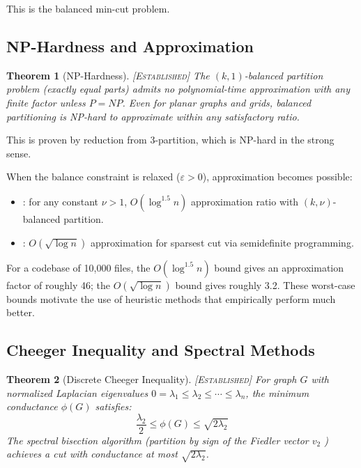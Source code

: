 \documentclass[11pt, a4paper, copyright]{googledeepmind}
\newtheorem{theorem}{Theorem}[section]
\newcommand{\established}{\textsc{[Established]}}
\begin{document}
This is the balanced min-cut problem.

\subsection{NP-Hardness and Approximation}

\begin{theorem}[NP-Hardness] \established{}
\label{thm:nphard}
The $(k, 1)$-balanced partition problem (exactly equal parts) admits no polynomial-time approximation with any finite factor unless $P = NP$.
Even for planar graphs and grids, balanced partitioning is NP-hard to approximate within any satisfactory ratio.
\end{theorem}

This is proven by reduction from 3-partition, which is NP-hard in the strong sense.

When the balance constraint is relaxed ($\varepsilon > 0$), approximation becomes possible:

\begin{itemize}[nosep]
  \item \citet{AndreevRacke2006}: for any constant $\nu > 1$, $O(\log^{1.5} n)$ approximation ratio with $(k, \nu)$-balanced partition.
  \item \citet{AroraRaoVazirani2009}: $O(\sqrt{\log n})$ approximation for sparsest cut via semidefinite programming.
\end{itemize}

For a codebase of 10,000 files, the $O(\log^{1.5} n)$ bound gives an approximation factor of roughly 46; the $O(\sqrt{\log n})$ bound gives roughly 3.2.
These worst-case bounds motivate the use of heuristic methods that empirically perform much better.

\subsection{Cheeger Inequality and Spectral Methods}

\begin{theorem}[Discrete Cheeger Inequality] \established{}
\label{thm:cheeger}
For graph $G$ with normalized Laplacian eigenvalues $0 = \lambda_1 \leq \lambda_2 \leq \cdots \leq \lambda_n$, the minimum conductance $\phi(G)$ satisfies:
\begin{equation}
\label{eq:cheeger}
  \frac{\lambda_2}{2} \leq \phi(G) \leq \sqrt{2\lambda_2}
\end{equation}
The spectral bisection algorithm (partition by sign of the Fiedler vector $v_2$ \citep{Fiedler1973}) achieves a cut with conductance at most $\sqrt{2\lambda_2}$.
\end{theorem}
\end{document}
